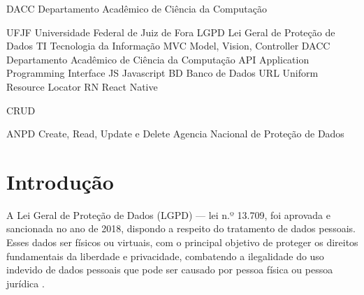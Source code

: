 \documentclass[
	12pt,				%
	openright,			%
	oneside,			%
	a4paper,			%
	english,			%
	french,				%
	spanish,			%
	brazil,				%
	]{abntex2}
\begin{document}
\listoffigures*
\cleardoublepage

\listoftables*
\cleardoublepage

\begin{siglas}
    \item[DACC] Departamento Acadêmico de Ciência da Computação
    \item[UFJF] Universidade Federal de Juiz de Fora
    LGPD Lei Geral de Proteção de Dados
TI
Tecnologia da Informação
MVC
Model, Vision, Controller
DACC
Departamento Acadêmico de Ciência da Computação
API
Application Programming Interface
JS
Javascript
BD
Banco de Dados
URL
Uniform Resource Locator
RN
React Native

CRUD 


ANPD
Create, Read, Update e Delete
Agencia Nacional de Proteção de Dados


    
\end{siglas}


\tableofcontents*



\textual
\setcounter{page}{1}
\chapter*{Introdução}
\label{chapter:introducao}
A Lei Geral de Proteção de Dados (LGPD) — lei n.º 13.709, foi aprovada e sancionada no ano de 2018, dispondo a respeito do tratamento de dados pessoais. Esses dados ser físicos ou virtuais, com o principal objetivo de proteger os direitos fundamentais da liberdade e privacidade, combatendo a ilegalidade do uso indevido de dados pessoais que pode ser causado por pessoa física ou pessoa jurídica \cite{01-01-LeiGeral}.
\end{document}
